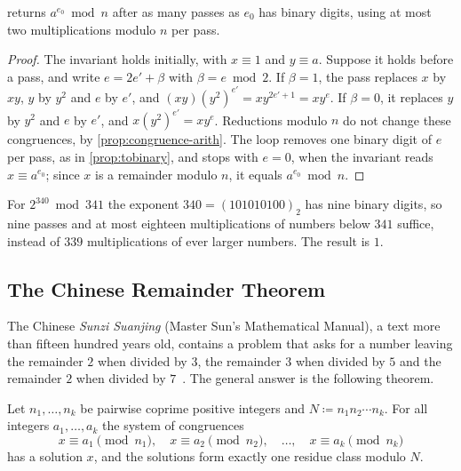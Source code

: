 \begin{proposition}
\label{prop:powmod}
 returns $a^{e_0}\bmod n$ after as many passes as $e_0$ has binary digits, using at most two multiplications modulo $n$ per pass.
\end{proposition}

\begin{proof}
The invariant holds initially, with $x\equiv1$ and $y\equiv a$. Suppose it holds before a pass, and write $e=2e'+\beta$ with $\beta=e\bmod2$. If $\beta=1$, the pass replaces $x$ by $xy$, $y$ by $y^2$ and $e$ by $e'$, and $(xy)(y^2)^{e'}=xy^{2e'+1}=xy^e$. If $\beta=0$, it replaces $y$ by $y^2$ and $e$ by $e'$, and $x(y^2)^{e'}=xy^e$. Reductions modulo $n$ do not change these congruences, by \cref{prop:congruence-arith}. The loop removes one binary digit of $e$ per pass, as in \cref{prop:tobinary}, and stops with $e=0$, when the invariant reads $x\equiv a^{e_0}$; since $x$ is a remainder modulo $n$, it equals $a^{e_0}\bmod n$.
\end{proof}

For $2^{340}\bmod341$ the exponent $340=(101010100)_2$ has nine binary digits, so nine passes and at most eighteen multiplications of numbers below $341$ suffice, instead of $339$ multiplications of ever larger numbers. The result is $1$.

\subsection{The Chinese Remainder Theorem}

The Chinese \emph{Sunzi Suanjing} (Master Sun's Mathematical Manual), a text more than fifteen hundred years old, contains a problem that asks for a number leaving the remainder $2$ when divided by $3$, the remainder $3$ when divided by $5$ and the remainder $2$ when divided by $7$~\cite{shen1988}. The general answer is the following theorem.

\begin{theorem}
\label{thm:crt}
Let $n_1,\ldots,n_k$ be pairwise coprime positive integers and $N\coloneqq n_1n_2\cdots n_k$. For all integers $a_1,\ldots,a_k$ the system of congruences
\[
x\equiv a_1\pmod{n_1},\quad x\equiv a_2\pmod{n_2},\quad\ldots,\quad x\equiv a_k\pmod{n_k}
\]
has a solution $x$, and the solutions form exactly one residue class modulo $N$.
\end{theorem}

